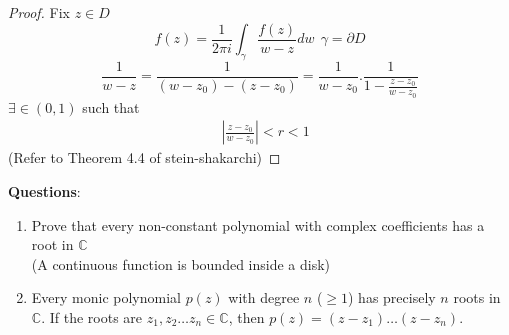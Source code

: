 \begin{proof}
Fix $z\in D$\\
\begin{equation*}
 f(z)=\frac{1}{2\pi i}\int_{\gamma}^{}\frac{f(z)}{w-z} dw \:\: \gamma=\partial D
\end{equation*}
\begin{equation*}
    \frac{1}{w-z}=\frac{1}{(w-z_0)-(z-z_0)}=\frac{1}{w-z_0}.\frac{1}{1-\frac{z-z_0}{w-z_0}}
\end{equation*}
$\exists\in (0,1)$ such that \\
\begin{equation*}
    \begin{split}
        &|\frac{z-z_0}{w-z_0}|<r<1
    \end{split}
\end{equation*}
(Refer to Theorem 4.4 of stein-shakarchi)
\end{proof}

\textbf{Questions}:
\begin{enumerate}
\item Prove that every non-constant polynomial with complex coefficients has a root in $\mathds{C}$ \\(A continuous function is bounded inside a disk)\\
\item Every monic polynomial $p(z)$ with degree $n$ ($\geq 1$) has precisely $n$ roots in $\mathds{C}$. If the roots are $z_1,z_2\dots z_n \in \mathds{C}$, then $p(z)= (z-z_1)\dots(z-z_n)$.\\
\end{enumerate}
